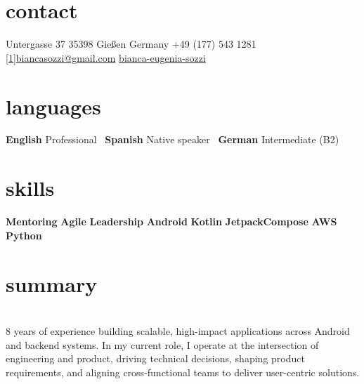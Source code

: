 \documentclass[a4paper,nocolors]{friggeri-cv}
\begin{document}


\begin{aside} %
\section{contact}
\pin \hfill Untergasse 37
35398 Gießen
Germany\vspace{0.5em}
{\Large\textcolor{gray}{\Mobilefone}} \hfill +49 (177) 543 1281
\hfill \href{mailto:biancasozzi@gmail.com}{\scalebox{0.9}[1]{biancasozzi@gmail.com}}\vspace{0.75em}
\llogo \hfill \href{https://www.linkedin.com/in/bianca-eugenia-sozzi}{bianca-eugenia-sozzi}\vspace{2em}
~
\section{languages}
\textbf{English} \hfill Professional~
\textbf{Spanish} \hfill Native speaker~
\textbf{German} \hfill Intermediate (B2)~\vspace{2em}
\section{skills}
\textbf{Mentoring} \hfill \filleddot \filleddot \filleddot \filleddot \emptydot
\textbf{Agile} \hfill \filleddot \filleddot \filleddot \filleddot \filleddot
\textbf{Leadership} \hfill \filleddot \filleddot \filleddot \emptydot \emptydot
\textbf{Android} \hfill \filleddot \filleddot \filleddot \filleddot \emptydot
\textbf{Kotlin} \hfill \filleddot \filleddot \filleddot \filleddot \emptydot
\textbf{JetpackCompose} \hfill \filleddot \filleddot \filleddot \emptydot \emptydot
\textbf{AWS} \hfill \filleddot \filleddot \emptydot \emptydot \emptydot
\textbf{Python} \hfill \filleddot \filleddot \emptydot \emptydot \emptydot
\end{aside}

\section{summary}
\vspace{1em}
\\
8 years of experience building scalable, high-impact applications across Android and backend systems.
In my current role, I operate at the intersection of engineering and product, driving technical decisions, shaping product requirements, and aligning cross-functional teams to deliver user-centric solutions.
\vspace{0.5em}
\end{document}
